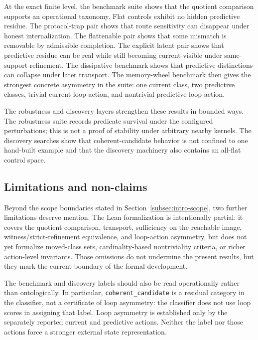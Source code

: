 \documentclass[11pt]{article}
\theoremstyle{definition}
\begin{document}
At the exact finite level, the benchmark suite shows that the quotient comparison supports an operational taxonomy. Flat controls exhibit no hidden predictive residue. The protocol-trap pair shows that route sensitivity can disappear under honest internalization. The flattenable pair shows that some mismatch is removable by admissible completion. The explicit latent pair shows that predictive residue can be real while still becoming current-visible under same-support refinement. The dissipative benchmark shows that predictive distinctions can collapse under later transport. The memory-wheel benchmark then gives the strongest concrete asymmetry in the suite: one current class, two predictive classes, trivial current loop action, and nontrivial predictive loop action.

The robustness and discovery layers strengthen these results in bounded ways. The robustness suite records predicate survival under the configured perturbations; this is not a proof of stability under arbitrary nearby kernels. The discovery searches show that coherent-candidate behavior is not confined to one hand-built example and that the discovery machinery also contains an all-flat control space.

\subsection{Limitations and non-claims}\label{subsec:discussion-limitations}
Beyond the scope boundaries stated in Section~\ref{subsec:intro-scope}, two further limitations deserve mention. The Lean formalization is intentionally partial: it covers the quotient comparison, transport, sufficiency on the reachable image, witness/strict-refinement equivalence, and loop-action asymmetry, but does not yet formalize moved-class sets, cardinality-based nontriviality criteria, or richer action-level invariants. Those omissions do not undermine the present results, but they mark the current boundary of the formal development.

The benchmark and discovery labels should also be read operationally rather than ontologically. In particular, \texttt{coherent\_candidate} is a residual category in the classifier, not a certificate of loop asymmetry: the classifier does not use loop scores in assigning that label. Loop asymmetry is established only by the separately reported current and predictive actions. Neither the label nor those actions force a stronger external state representation.
\end{document}
